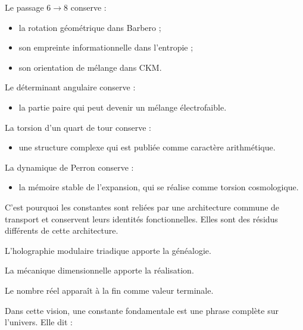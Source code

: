 Le passage \(6\to8\) conserve :\par

\begin{itemize}[leftmargin=*,itemsep=0.35em]
\item la rotation géométrique dans Barbero ;
\item son empreinte informationnelle dans l’entropie ;
\item son orientation de mélange dans CKM.
\end{itemize}

Le déterminant angulaire conserve :\par

\begin{itemize}[leftmargin=*,itemsep=0.35em]
\item la partie paire qui peut devenir un mélange électrofaible.
\end{itemize}

La torsion d’un quart de tour conserve :\par

\begin{itemize}[leftmargin=*,itemsep=0.35em]
\item une structure complexe qui est publiée comme caractère arithmétique.
\end{itemize}

La dynamique de Perron conserve :\par

\begin{itemize}[leftmargin=*,itemsep=0.35em]
\item la mémoire stable de l’expansion, qui se réalise comme torsion cosmologique.
\end{itemize}

C’est pourquoi les constantes sont reliées par une architecture commune de transport et conservent leurs identités fonctionnelles. Elles sont des résidus différents de cette architecture.\par

L’holographie modulaire triadique apporte la généalogie.\par
La mécanique dimensionnelle apporte la réalisation.\par
Le nombre réel apparaît à la fin comme valeur terminale.\par

Dans cette vision, une constante fondamentale est une phrase complète sur l’univers. Elle dit :\par

